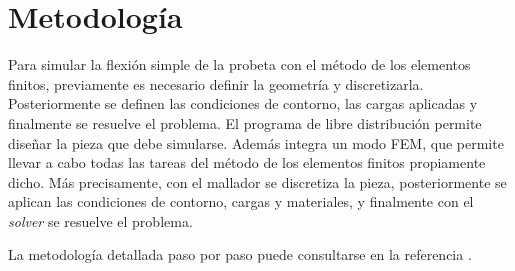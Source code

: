 
\section{Metodología}

Para simular la flexión simple de la probeta con el método de los elementos finitos, previamente es necesario definir la geometría y discretizarla. Posteriormente se definen las condiciones de contorno, las cargas aplicadas y finalmente se resuelve el problema. El programa de libre distribución  permite diseñar la pieza que debe simularse. Además integra un modo FEM, que permite llevar a cabo todas las tareas del método de los elementos finitos propiamente dicho. Más precisamente, con el mallador  se discretiza la pieza, posteriormente se aplican las condiciones de contorno, cargas y materiales, y finalmente con el \emph{solver}  se resuelve el problema. 

La metodología detallada paso por paso puede consultarse en la referencia \cite{manualPractica1}.
